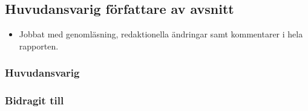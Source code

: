 \subsection{Huvudansvarig författare av avsnitt}
\begin{itemize}
  \item Jobbat med genomläsning, redaktionella ändringar samt kommentarer i hela rapporten.
\end{itemize}

\subsubsection{Huvudansvarig}
\begin{itemize}

\end{itemize}

\subsubsection{Bidragit till}
\begin{itemize}

\end{itemize}